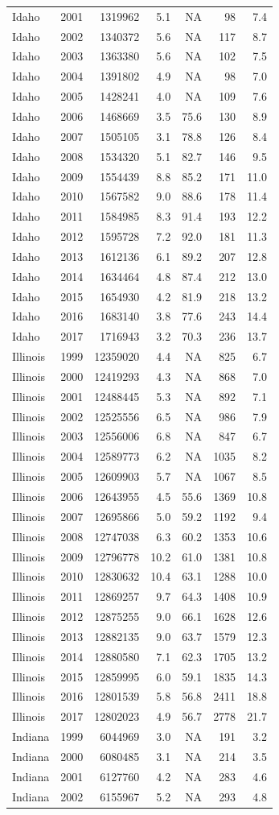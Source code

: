\documentclass[
]{article}
\begin{document}
\begin{longtable}[]{@{}lrrrrrr@{}}
Idaho & 2001 & 1319962 & 5.1 & NA & 98 & 7.4\tabularnewline
Idaho & 2002 & 1340372 & 5.6 & NA & 117 & 8.7\tabularnewline
Idaho & 2003 & 1363380 & 5.6 & NA & 102 & 7.5\tabularnewline
Idaho & 2004 & 1391802 & 4.9 & NA & 98 & 7.0\tabularnewline
Idaho & 2005 & 1428241 & 4.0 & NA & 109 & 7.6\tabularnewline
Idaho & 2006 & 1468669 & 3.5 & 75.6 & 130 & 8.9\tabularnewline
Idaho & 2007 & 1505105 & 3.1 & 78.8 & 126 & 8.4\tabularnewline
Idaho & 2008 & 1534320 & 5.1 & 82.7 & 146 & 9.5\tabularnewline
Idaho & 2009 & 1554439 & 8.8 & 85.2 & 171 & 11.0\tabularnewline
Idaho & 2010 & 1567582 & 9.0 & 88.6 & 178 & 11.4\tabularnewline
Idaho & 2011 & 1584985 & 8.3 & 91.4 & 193 & 12.2\tabularnewline
Idaho & 2012 & 1595728 & 7.2 & 92.0 & 181 & 11.3\tabularnewline
Idaho & 2013 & 1612136 & 6.1 & 89.2 & 207 & 12.8\tabularnewline
Idaho & 2014 & 1634464 & 4.8 & 87.4 & 212 & 13.0\tabularnewline
Idaho & 2015 & 1654930 & 4.2 & 81.9 & 218 & 13.2\tabularnewline
Idaho & 2016 & 1683140 & 3.8 & 77.6 & 243 & 14.4\tabularnewline
Idaho & 2017 & 1716943 & 3.2 & 70.3 & 236 & 13.7\tabularnewline
Illinois & 1999 & 12359020 & 4.4 & NA & 825 & 6.7\tabularnewline
Illinois & 2000 & 12419293 & 4.3 & NA & 868 & 7.0\tabularnewline
Illinois & 2001 & 12488445 & 5.3 & NA & 892 & 7.1\tabularnewline
Illinois & 2002 & 12525556 & 6.5 & NA & 986 & 7.9\tabularnewline
Illinois & 2003 & 12556006 & 6.8 & NA & 847 & 6.7\tabularnewline
Illinois & 2004 & 12589773 & 6.2 & NA & 1035 & 8.2\tabularnewline
Illinois & 2005 & 12609903 & 5.7 & NA & 1067 & 8.5\tabularnewline
Illinois & 2006 & 12643955 & 4.5 & 55.6 & 1369 & 10.8\tabularnewline
Illinois & 2007 & 12695866 & 5.0 & 59.2 & 1192 & 9.4\tabularnewline
Illinois & 2008 & 12747038 & 6.3 & 60.2 & 1353 & 10.6\tabularnewline
Illinois & 2009 & 12796778 & 10.2 & 61.0 & 1381 & 10.8\tabularnewline
Illinois & 2010 & 12830632 & 10.4 & 63.1 & 1288 & 10.0\tabularnewline
Illinois & 2011 & 12869257 & 9.7 & 64.3 & 1408 & 10.9\tabularnewline
Illinois & 2012 & 12875255 & 9.0 & 66.1 & 1628 & 12.6\tabularnewline
Illinois & 2013 & 12882135 & 9.0 & 63.7 & 1579 & 12.3\tabularnewline
Illinois & 2014 & 12880580 & 7.1 & 62.3 & 1705 & 13.2\tabularnewline
Illinois & 2015 & 12859995 & 6.0 & 59.1 & 1835 & 14.3\tabularnewline
Illinois & 2016 & 12801539 & 5.8 & 56.8 & 2411 & 18.8\tabularnewline
Illinois & 2017 & 12802023 & 4.9 & 56.7 & 2778 & 21.7\tabularnewline
Indiana & 1999 & 6044969 & 3.0 & NA & 191 & 3.2\tabularnewline
Indiana & 2000 & 6080485 & 3.1 & NA & 214 & 3.5\tabularnewline
Indiana & 2001 & 6127760 & 4.2 & NA & 283 & 4.6\tabularnewline
Indiana & 2002 & 6155967 & 5.2 & NA & 293 & 4.8\tabularnewline

\end{longtable}
\end{document}
